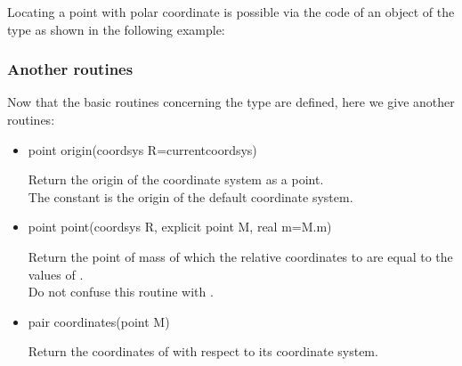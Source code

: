 \documentclass[pdftex]{article}
\begin{document}
Locating a point with polar coordinate is possible via the code
 of an object of the type
 as shown in the following example:

\subsubsection{Another routines}
Now that the basic routines concerning the type  are
defined, here we give another routines:
\begin{itemize}
\item {}
  \begin{Vcolor}
    point origin(coordsys R=currentcoordsys)
  \end{Vcolor}
  Return the origin of the coordinate system  as a point.\\
  The constant  is the origin of the
  default coordinate system.
\item {}
  \begin{Vcolor}
    point point(coordsys R, explicit point M, real m=M.m)
  \end{Vcolor}
  Return the point of mass  of which the relative coordinates
  to  are equal to the values of .\\ Do not confuse
  this routine with  .

\item {}
  \begin{Vcolor}
    pair coordinates(point M)
  \end{Vcolor}
  Return the coordinates of  with respect to its coordinate system.


\end{itemize}
\end{document}
